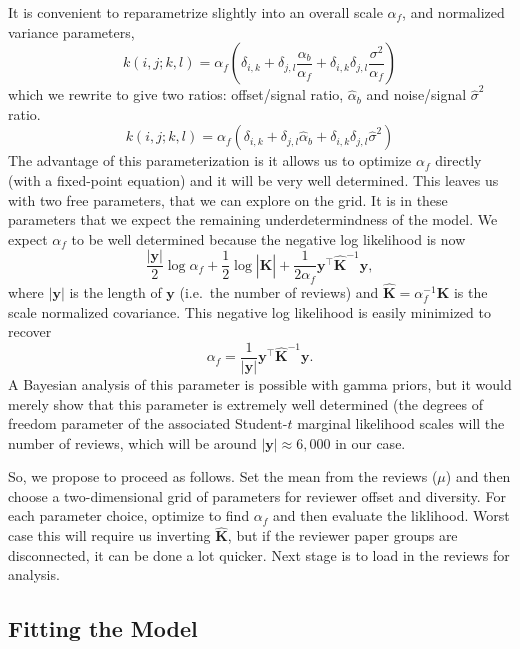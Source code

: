 It is convenient to reparametrize slightly into an overall scale
\(\alpha_f\), and normalized variance parameters, \[
k(i,j; k,l) = \alpha_f\left(\delta_{i,k}  + \delta_{j,l} \frac{\alpha_b}{\alpha_f} + \delta_{i, k}\delta_{j,l} \frac{\sigma^2}{\alpha_f}\right)
\] which we rewrite to give two ratios: offset/signal ratio,
\(\hat{\alpha}_b\) and noise/signal \(\hat{\sigma}^2\) ratio. \[
k(i,j; k,l) = \alpha_f\left(\delta_{i,k}  + \delta_{j,l} \hat{\alpha}_b + \delta_{i, k}\delta_{j,l} \hat{\sigma}^2\right)
\] The advantage of this parameterization is it allows us to optimize
\(\alpha_f\) directly (with a fixed-point equation) and it will be very
well determined. This leaves us with two free parameters, that we can
explore on the grid. It is in these parameters that we expect the
remaining underdetermindness of the model. We expect \(\alpha_f\) to be
well determined because the negative log likelihood is now \[
\frac{|\mathbf{y}|}{2}\log\alpha_f + \frac{1}{2}\log  \left|\hat{\mathbf{K}}\right| + \frac{1}{2\alpha_f}\mathbf{y}^\top \hat{\mathbf{K}}^{-1} \mathbf{y},
\] where \(|\mathbf{y}|\) is the length of \(\mathbf{y}\) (i.e.~the
number of reviews) and \(\hat{\mathbf{K}}=\alpha_f^{-1}\mathbf{K}\) is
the scale normalized covariance. This negative log likelihood is easily
minimized to recover \[
\alpha_f = \frac{1}{|\mathbf{y}|} \mathbf{y}^\top \hat{\mathbf{K}}^{-1} \mathbf{y}.
\] A Bayesian analysis of this parameter is possible with gamma priors,
but it would merely show that this parameter is extremely well
determined (the degrees of freedom parameter of the associated
Student-\(t\) marginal likelihood scales will the number of reviews,
which will be around \(|\mathbf{y}| \approx 6,000\) in our case.

So, we propose to proceed as follows. Set the mean from the reviews
(\(\mu\)) and then choose a two-dimensional grid of parameters for
reviewer offset and diversity. For each parameter choice, optimize to
find \(\alpha_f\) and then evaluate the liklihood. Worst case this will
require us inverting \(\hat{\mathbf{K}}\), but if the reviewer paper
groups are disconnected, it can be done a lot quicker. Next stage is to
load in the reviews for analysis.

\hypertarget{fitting-the-model}{%
\subsection{Fitting the Model}\label{fitting-the-model}}

\begin{flushright}
\end{flushright}


